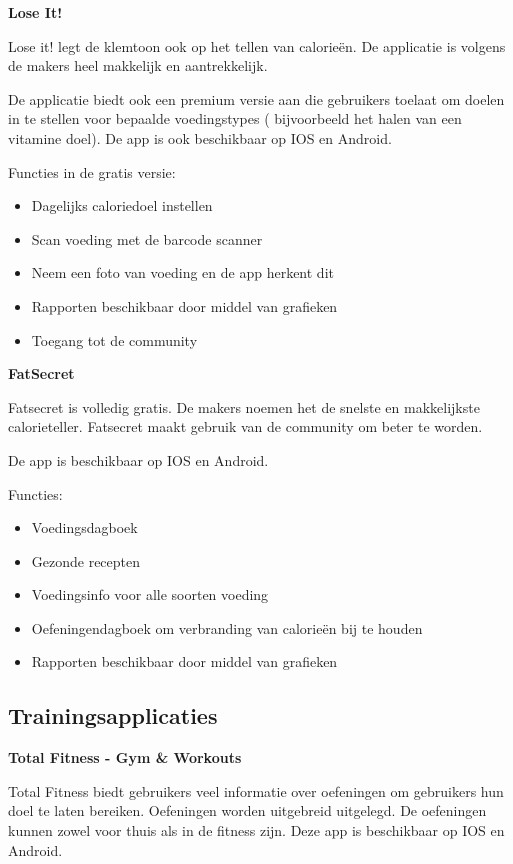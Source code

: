 \textbf{Lose It!}

Lose it! legt de klemtoon ook op het tellen van calorieën. De applicatie is volgens de makers heel makkelijk en aantrekkelijk.

De applicatie biedt ook een premium versie aan die gebruikers toelaat om doelen in te stellen voor bepaalde voedingstypes ( bijvoorbeeld het halen van een vitamine doel).
De app is ook beschikbaar op IOS en Android.

Functies in de gratis versie:
\begin{itemize}
\item Dagelijks caloriedoel instellen
\item Scan voeding met de barcode scanner
\item Neem een foto van voeding en de app herkent dit
\item Rapporten beschikbaar door middel van grafieken
\item Toegang tot de community 
\end{itemize}


\textbf{FatSecret}

Fatsecret is volledig gratis. De makers noemen het de snelste en makkelijkste calorieteller. Fatsecret maakt gebruik van de community om beter te worden. 

De app is beschikbaar op IOS en Android.

Functies:
\begin{itemize}
\item Voedingsdagboek
\item Gezonde recepten
\item Voedingsinfo voor alle soorten voeding
\item Oefeningendagboek om verbranding van calorieën bij te houden
\item Rapporten beschikbaar door middel van grafieken
\end{itemize}

\newpage
\subsection{Trainingsapplicaties}
\label{sec:Trainingsapplicaties}


\textbf{Total Fitness - Gym \& Workouts}

Total Fitness biedt gebruikers veel informatie over oefeningen om gebruikers hun doel te laten bereiken. Oefeningen worden uitgebreid uitgelegd. De oefeningen kunnen zowel voor thuis als in de fitness zijn.
Deze app is beschikbaar op IOS en Android.


